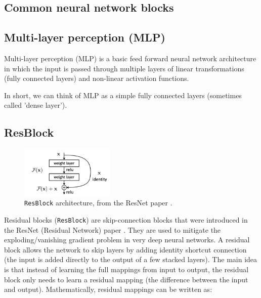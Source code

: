 \subsection{Common neural network blocks}
\label{appendix:blocks}



\subsection*{Multi-layer perception (MLP)}

Multi-layer perception (MLP) is a basic feed forward neural network architecture in which the input is passed through multiple layers of linear transformations (fully connected layers) and non-linear activation functions.

In short, we can think of MLP as a simple fully connected layers (sometimes called 'dense layer').








\subsection*{ResBlock}

\begin{figure}
    \centering
    \includegraphics[width=0.4\textwidth]{images/appendix/blocks/resnet.png}
    \caption{\texttt{ResBlock} architecture, from the ResNet paper \cite{resnet}.}
    \label{fig:appendix_blocks_residual_block}
\end{figure}

Residual blocks (\texttt{ResBlock}) are skip-connection blocks that were introduced in the ResNet (Residual Network) paper \cite{resnet}. They are used to mitigate the exploding/vanishing gradient problem in very deep neural networks. A residual block allows the network to skip layers by adding identity shortcut connection (the input is added directly to the output of a few stacked layers). The main idea is that instead of learning the full mappings from input to output, the residual block only needs to learn a residual mapping (the difference between the input and output). Mathematically, residual mappings can be written as:

